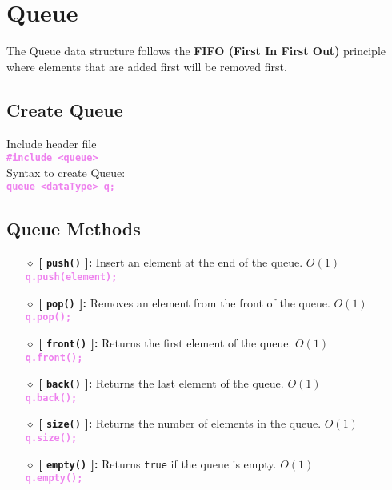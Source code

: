 \newpage
\section{Queue}
The Queue data structure follows the \textbf{FIFO (First In First Out)} principle where elements that are added first will be removed first.

\subsection{Create Queue}
Include header file\\
\tab \tab \textbf{\textcolor{violet}{\texttt{\#include <queue>}}}\\
Syntax to create Queue:\\
\tab \tab \textbf{\textcolor{violet}{\texttt{queue <dataType> q;}}}

\subsection{Queue Methods}
\begin{itemize}

	\item[{\LARGE $\diamond$}] \textbf{[ \texttt{push()} ]:} Insert an element at the end of the queue. $O(1)$\\
	\tab \textbf{\textcolor{violet}{\texttt{q.push(element);}}}
	
	\item[{\LARGE $\diamond$}] \textbf{[ \texttt{pop()} ]:} Removes an element from the front of the queue. $O(1)$\\
	\tab \textbf{\textcolor{violet}{\texttt{q.pop();}}}
	
	\item[{\LARGE $\diamond$}] \textbf{[ \texttt{front()} ]:} Returns the first element of the queue. $O(1)$\\
	\tab \textbf{\textcolor{violet}{\texttt{q.front();}}}
	
	\item[{\LARGE $\diamond$}] \textbf{[ \texttt{back()} ]:} Returns the last element of the queue. $O(1)$\\
	\tab \textbf{\textcolor{violet}{\texttt{q.back();}}}
	
	\item[{\LARGE $\diamond$}] \textbf{[ \texttt{size()} ]:} Returns the number of elements in the queue. $O(1)$\\
	\tab \textbf{\textcolor{violet}{\texttt{q.size();}}}
	
	\item[{\LARGE $\diamond$}] \textbf{[ \texttt{empty()} ]:} Returns \texttt{true} if the queue is empty. $O(1)$\\
	\tab \textbf{\textcolor{violet}{\texttt{q.empty();}}}
	
\end{itemize}


